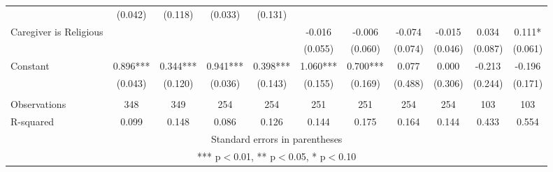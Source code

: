 \begin{tabular}{lcccccccccc}
 & (0.042) & (0.118) & (0.033) & (0.131) &  &  &  &  &  &  \\
Caregiver is Religious &  &  &  &  & -0.016 & -0.006 & -0.074 & -0.015 & 0.034 & 0.111* \\
 &  &  &  &  & (0.055) & (0.060) & (0.074) & (0.046) & (0.087) & (0.061) \\
Constant & 0.896*** & 0.344*** & 0.941*** & 0.398*** & 1.060*** & 0.700*** & 0.077 & 0.000 & -0.213 & -0.196 \\
 & (0.043) & (0.120) & (0.036) & (0.143) & (0.155) & (0.169) & (0.488) & (0.306) & (0.244) & (0.171) \\
 &  &  &  &  &  &  &  &  &  &  \\
Observations & 348 & 349 & 254 & 254 & 251 & 251 & 254 & 254 & 103 & 103 \\
 R-squared & 0.099 & 0.148 & 0.086 & 0.126 & 0.144 & 0.175 & 0.164 & 0.144 & 0.433 & 0.554 \\ \hline
\multicolumn{11}{c}{ Standard errors in parentheses} \\
\multicolumn{11}{c}{ *** p$<$0.01, ** p$<$0.05, * p$<$0.10} \\
\end{tabular}
